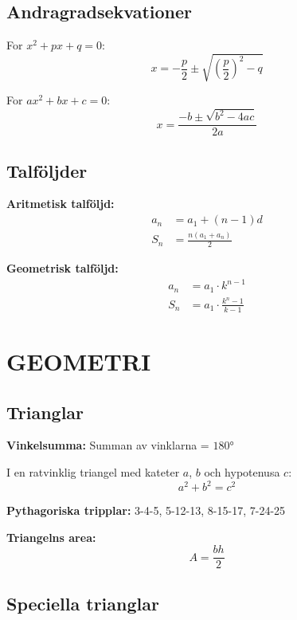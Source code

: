 \documentclass[11pt,a4paper]{article}
\begin{document}
\subsection{Andragradsekvationer}

\begin{tcolorbox}[title=PQ-formeln]
For $x^2 + px + q = 0$:
\[ x = -\frac{p}{2} \pm \sqrt{\left(\frac{p}{2}\right)^2 - q} \]
\end{tcolorbox}

\begin{tcolorbox}[title=ABC-formeln]
For $ax^2 + bx + c = 0$:
\[ x = \frac{-b \pm \sqrt{b^2 - 4ac}}{2a} \]
\end{tcolorbox}

\subsection{Talföljder}

\textbf{Aritmetisk talföljd:}
\begin{align}
a_n &= a_1 + (n-1)d \\
S_n &= \frac{n(a_1 + a_n)}{2}
\end{align}

\textbf{Geometrisk talföljd:}
\begin{align}
a_n &= a_1 \cdot k^{n-1} \\
S_n &= a_1 \cdot \frac{k^n - 1}{k - 1}
\end{align}

\section{GEOMETRI}

\subsection{Trianglar}

\textbf{Vinkelsumma:} Summan av vinklarna = $180°$

\begin{tcolorbox}[title=Pythagoras sats]
I en ratvinklig triangel med kateter $a$, $b$ och hypotenusa $c$:
\[ a^2 + b^2 = c^2 \]
\end{tcolorbox}

\textbf{Pythagoriska tripplar:} 3-4-5, 5-12-13, 8-15-17, 7-24-25

\textbf{Triangelns area:}
\[ A = \frac{bh}{2} \]

\subsection{Speciella trianglar}
\end{document}
